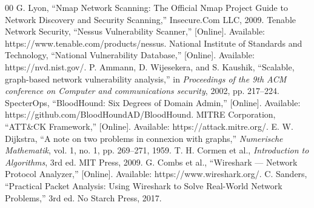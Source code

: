 \documentclass[conference]{IEEEtran}
\begin{document}
\begin{thebibliography}{00}
 G. Lyon, ``Nmap Network Scanning: The Official Nmap Project Guide to Network Discovery and Security Scanning,'' Insecure.Com LLC, 2009.
 Tenable Network Security, ``Nessus Vulnerability Scanner,'' [Online]. Available: https://www.tenable.com/products/nessus.
 National Institute of Standards and Technology, ``National Vulnerability Database,'' [Online]. Available: https://nvd.nist.gov/.
 P. Ammann, D. Wijesekera, and S. Kaushik, ``Scalable, graph-based network vulnerability analysis,'' in \emph{Proceedings of the 9th ACM conference on Computer and communications security}, 2002, pp. 217--224.
 SpecterOps, ``BloodHound: Six Degrees of Domain Admin,'' [Online]. Available: https://github.com/BloodHoundAD/BloodHound.
 MITRE Corporation, ``ATT\&CK Framework,'' [Online]. Available: https://attack.mitre.org/.
 E. W. Dijkstra, ``A note on two problems in connexion with graphs,'' \emph{Numerische Mathematik}, vol. 1, no. 1, pp. 269--271, 1959.
 T. H. Cormen et al., \emph{Introduction to Algorithms}, 3rd ed. MIT Press, 2009.
 G. Combs et al., ``Wireshark --- Network Protocol Analyzer,'' [Online]. Available: https://www.wireshark.org/.
 C. Sanders, ``Practical Packet Analysis: Using Wireshark to Solve Real-World Network Problems,'' 3rd ed. No Starch Press, 2017.
\end{thebibliography}
\end{document}

